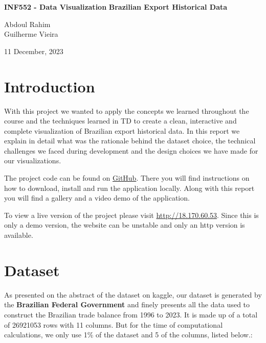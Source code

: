 \documentclass[12pt,a4]{article}
\begin{document}
\vspace*{\fill}
    \begin{center}
    
        \huge{\textbf{INF552 - Data Visualization}}
        \huge{\textbf{Brazilian Export Historical Data}}
        
        
        \vspace{3cm}
        \normalsize
        
        Abdoul Rahim\\
        Guilherme Vieira\\
 
        \vspace{1cm}
        
        11 December, 2023
       
    \end{center}

\vspace*{\fill}


\newpage

\section{Introduction}
With this project we wanted to apply the concepts we learned throughout the course and the techniques learned in TD to create a clean, interactive and complete visualization of Brazilian export historical data. In this report we explain in detail what was the rationale behind the dataset choice, the technical challenges we faced during development and the design choices we have made for our visualizations. 

The project code can be found on \href{http://www.github.com/guilevieiram/BRViz}{GitHub}. There you  will find instructions on how to download, install and run the application locally. Along with this report you will find a gallery and a video demo of the application.

To view a live version of the project please visit \href{http://18.170.60.53}{http://18.170.60.53}. Since this is only a demo version, the website can be unstable and only an http version is available.

\section{Dataset}
As presented on the abstract of the dataset on kaggle, our dataset is generated by the \textbf{Brazilian Federal Government} and finely presents all the data used to construct the Brazilian trade balance from 1996 to 2023. It is made up of a total of 26921053 rows with 11 columns. But for the time of computational calculations, we only use 1\% of the dataset and 5 of the columns, listed below.: 
\end{document}
